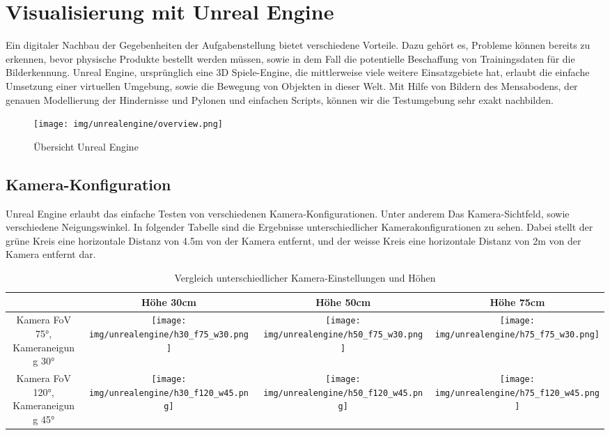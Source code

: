 \newpage
\section{Visualisierung mit Unreal Engine}
Ein digitaler Nachbau der Gegebenheiten der Aufgabenstellung bietet verschiedene Vorteile. Dazu gehört es, Probleme können bereits zu erkennen, bevor physische Produkte bestellt werden müssen, sowie in dem Fall die potentielle Beschaffung von Trainingsdaten für die Bilderkennung. Unreal Engine, ursprünglich eine 3D Spiele-Engine, die mittlerweise viele weitere Einsatzgebiete hat, erlaubt die einfache Umsetzung einer virtuellen Umgebung, sowie die Bewegung von Objekten in dieser Welt. Mit Hilfe von Bildern des Mensabodens, der genauen Modellierung der Hindernisse und Pylonen und einfachen Scripts, können wir die Testumgebung sehr exakt nachbilden.

\begin{figure}[h!]
            \centering
            \texttt{[image: img/unrealengine/overview.png]}
            \caption{Übersicht Unreal Engine}
        \label{img:Übersicht Unreal Engine}
        \end{figure}
\subsection{Kamera-Konfiguration}
Unreal Engine erlaubt das einfache Testen von verschiedenen Kamera-Konfigurationen. Unter anderem Das Kamera-Sichtfeld, sowie verschiedene Neigungswinkel. In folgender Tabelle sind die Ergebnisse unterschiedlicher Kamerakonfigurationen zu sehen. Dabei stellt der grüne Kreis eine horizontale Distanz von 4.5m von der Kamera entfernt, und der weisse Kreis eine horizontale Distanz von 2m von der Kamera entfernt dar.
\begin{table}[h!]
    \centering
    \begin{tabular}{|c|c|c|c|}
        \hline
        & Höhe 30cm & Höhe 50cm & Höhe 75cm \\
        \hline
        \parbox[c][2cm][c]{4cm}{\centering Kamera FoV 75°, \\ Kameraneigung 30°} & 
        \texttt{[image: img/unrealengine/h30\_f75\_w30.png]} & 
        \texttt{[image: img/unrealengine/h50\_f75\_w30.png]} & 
        \texttt{[image: img/unrealengine/h75\_f75\_w30.png]} \\
        \hline
        \parbox[c][2cm][c]{4cm}{\centering Kamera FoV 120°, \\ Kameraneigung 45°} & 
        \texttt{[image: img/unrealengine/h30\_f120\_w45.png]} & 
        \texttt{[image: img/unrealengine/h50\_f120\_w45.png]} & 
        \texttt{[image: img/unrealengine/h75\_f120\_w45.png]} \\
        \hline
    \end{tabular}
    \caption{Vergleich unterschiedlicher Kamera-Einstellungen und Höhen}
\end{table}


